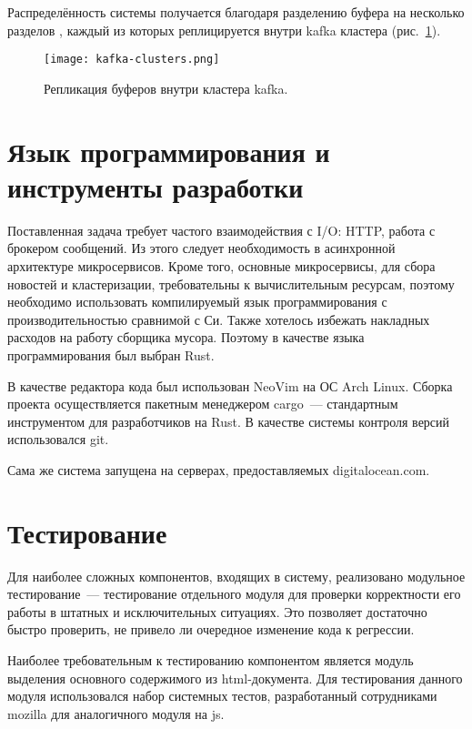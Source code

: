 Распределённость системы получается благодаря разделению буфера на несколько разделов \cite{wang12}, каждый из которых реплицируется внутри kafka кластера (рис.~\ref{fig:kafka-clusters}).

\begin{figure}[h]
    \centering
    \texttt{[image: kafka-clusters.png]}
    \caption{Репликация буферов внутри кластера kafka.}
    \label{fig:kafka-clusters}
\end{figure}

\section{Язык программирования и инструменты разработки}
Поставленная задача требует частого взаимодействия с I/O: HTTP, работа с брокером сообщений. Из этого следует необходимость в асинхронной архитектуре микросервисов. Кроме того, основные микросервисы, для сбора новостей и кластеризации, требовательны к вычислительным ресурсам, поэтому необходимо использовать компилируемый язык программирования с производительностью сравнимой с Си. Также хотелось избежать накладных расходов на работу сборщика мусора. Поэтому в качестве языка программирования был выбран Rust.

В качестве редактора кода был использован NeoVim на ОС Arch Linux. Сборка проекта осуществляется пакетным менеджером cargo~--- стандартным инструментом для разработчиков на Rust. В качестве системы контроля версий использовался git.

Сама же система запущена на серверах, предоставляемых digitalocean.com.

\section{Тестирование}
Для наиболее сложных компонентов, входящих в систему, реализовано модульное тестирование~--- тестирование отдельного модуля для проверки корректности его работы в штатных и исключительных ситуациях. Это позволяет достаточно быстро проверить, не привело ли очередное изменение кода к регрессии.

Наиболее требовательным к тестированию компонентом является модуль выделения основного содержимого из html-документа. Для тестирования данного модуля использовался набор системных тестов, разработанный сотрудниками mozilla для аналогичного модуля на js.
